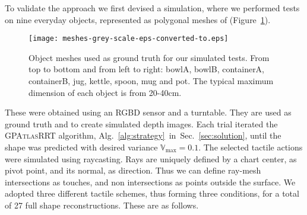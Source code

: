 
To validate the approach we first devised a simulation, where we performed tests on nine everyday objects, represented as polygonal meshes of (Figure~\ref{fig:meshes}).
\begin{figure}[t]
    \centering
    \texttt{[image: meshes-grey-scale-eps-converted-to.eps]}
    \caption{Object meshes used as ground truth for our simulated tests. From top to bottom and from left to right: bowlA, bowlB, containerA, containerB, jug, kettle, spoon, mug and pot. The typical maximum dimension of each object is from 20-40cm.}
    \label{fig:meshes}
\end{figure}
These were obtained using an RGBD sensor and a turntable. They are used as ground truth and to create simulated depth images. Each trial iterated the \textsc{GPAtlasRRT} algorithm, Alg.~\ref{alg:strategy}~in~Sec.~\ref{sec:solution},
until the shape was predicted with desired variance $\mathbb{V}_{\max} = 0.1$.
The selected tactile actions were simulated using  raycasting. Rays are uniquely defined by a chart center, as pivot point, and its normal, as direction.
Thus we can define ray-mesh intersections as touches, and non intersections as points outside the surface. We adopted three different tactile schemes, thus forming three conditions, for a total of 27 full shape reconstructions. These are as follows.

